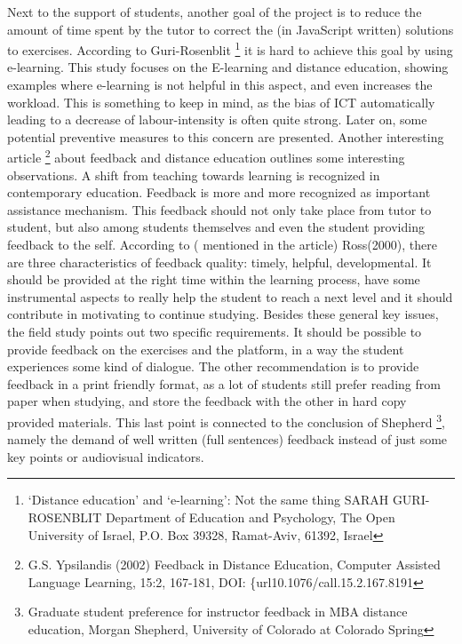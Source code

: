 \documentclass{article}
\begin{document}
Next to the support of students, another goal of the project is to reduce the 
amount of time spent by the tutor to correct the (in JavaScript written) 
solutions to exercises. According to Guri-Rosenblit
\footnote{‘Distance education’ and 
‘e-learning’: Not the same thing
SARAH GURI-ROSENBLIT
Department of Education and Psychology, The Open University of Israel, P.O. Box
39328, Ramat-Aviv, 61392, Israel} it is hard to achieve this goal by using 
e-learning. This study focuses on the E-learning and distance education, 
showing
examples where e-learning is not helpful in this aspect, and even 
increases the workload. This is something to keep in mind, as the bias of 
ICT automatically leading to a decrease of labour-intensity is often quite strong.
Later on, some potential preventive measures to this concern
are presented. \newline Another interesting article 
\footnote{G.S. Ypsilandis (2002) Feedback in Distance Education, Computer
Assisted Language Learning, 15:2, 167-181, DOI: 
\{url{10.1076/call.15.2.167.8191}} about feedback and distance education 
outlines some interesting observations. A shift from teaching towards learning
is recognized in contemporary education. Feedback is more and more 
recognized as important assistance mechanism. This feedback should not only
take place from tutor to student, but also among students themselves and even
the student providing feedback to the self. According to (
mentioned in the article) Ross(2000), there are 
three characteristics of feedback quality: timely, helpful, developmental. It
should be provided at the right time within the learning process, have some 
instrumental aspects to really help the student to reach a next level and it 
should contribute in motivating to continue studying. Besides these general 
key issues, the field study points out two specific requirements. It should be
possible to provide feedback on the exercises and the platform, in a way the
student experiences some kind of dialogue. The other
recommendation is to provide feedback in a print friendly format, as a lot of 
students still prefer reading from paper when studying, and store
the feedback with the other
in hard copy provided materials. This last point is connected to the conclusion 
of Shepherd
\footnote{Graduate student preference for instructor feedback in MBA
distance education,
Morgan Shepherd,
University of Colorado at Colorado Spring}, namely the demand of well written
(full sentences) 
feedback instead of just some key points or audiovisual indicators.
\end{document}
